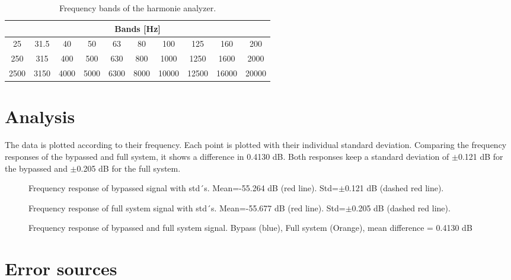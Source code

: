 \begin{table}[H]
\centering
\begin{tabular}{|c|c|c|c|c|c|c|c|c|c|}
\hline
\multicolumn{10}{|c|}{Bands [Hz]}                                       \\ \hline
25   & 31.5 & 40   & 50   & 63   & 80   & 100   & 125   & 160   & 200   \\ \hline
250  & 315  & 400  & 500  & 630  & 800  & 1000  & 1250  & 1600  & 2000  \\ \hline
2500 & 3150 & 4000 & 5000 & 6300 & 8000 & 10000 & 12500 & 16000 & 20000 \\ \hline
\end{tabular}
\caption{Frequency bands of the harmonie analyzer.}
\label{tb:freqBands2}
\end{table}

\section{Analysis}
The data is plotted according to their frequency. Each point is plotted with their individual standard deviation. Comparing the frequency responses of the bypassed and full system, it shows a difference in 0.4130 dB. Both responses keep a standard deviation of $\pm$0.121 dB for the bypassed and $\pm$0.205 dB for the full system.
\begin{figure}[H]
	\centering
	
	\caption{Frequency response of bypassed signal with std´s. Mean=-55.264 dB (red line). Std=$\pm$0.121 dB (dashed red line).}
	\label{fig:FreqRespBypass}
\end{figure}

\begin{figure}[H]
	\centering
	
	\caption{Frequency response of full system signal with std´s. Mean=-55.677 dB (red line). Std=$\pm$0.205 dB (dashed red line).}
	\label{fig:FreqRespSystem}
\end{figure}

\begin{figure}[H]
	\centering
	
	\caption{Frequency response of bypassed and full system signal. Bypass (blue), Full system (Orange), mean difference = 0.4130 dB}
	\label{fig:FreqRespComp}
\end{figure}


\section{Error sources}

